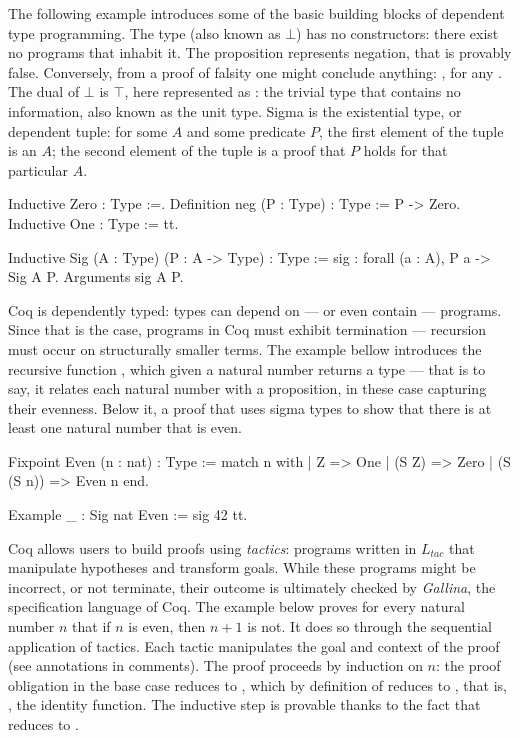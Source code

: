 \documentclass{mproj}
\begin{document}
The following example introduces some of the basic building blocks of dependent type programming. The type  (also known as $\bot$) has no constructors: there exist no programs that inhabit it. The proposition  represents negation, that  is provably false. Conversely, from a proof of falsity one might conclude anything: , for any . The dual of $\bot$ is $\top$, here represented as : the trivial type that contains no information, also known as the unit type. Sigma is the existential type, or dependent tuple: for some $A$ and some predicate $P$, the first element of the tuple is an $A$; the second element of the tuple is a proof that $P$ holds for that particular $A$.

\begin{coq}
    Inductive Zero : Type :=.
    Definition neg (P : Type) : Type := P -> Zero.
    Inductive One : Type := tt.

    Inductive Sig (A : Type) (P : A -> Type) : Type :=
      sig : forall (a : A), P a -> Sig A P.
    Arguments sig {A P}.
\end{coq}

Coq is dependently typed: types can depend on --- or even contain --- programs. Since that is the case, programs in Coq must exhibit termination --- recursion must occur on structurally smaller terms. The example bellow introduces the recursive function , which given a natural number returns a type --- that is to say, it relates each natural number with a proposition, in these case capturing their evenness. Below it, a proof that uses sigma types to show that there is at least one natural number that is even.

\begin{coq}
    Fixpoint Even (n : nat) : Type :=
      match n with
      | Z         => One
      | (S Z)     => Zero
      | (S (S n)) => Even n
      end.

    Example _ : Sig nat Even := sig 42 tt.
\end{coq}

Coq allows users to build proofs using \emph{tactics}: programs written in $L_{tac}$ that manipulate hypotheses and transform goals. While these programs might be incorrect, or not terminate, their outcome is ultimately checked by \emph{Gallina}, the specification language of Coq. The example below proves for every natural number $n$ that if $n$ is even, then $n+1$ is not. It does so through the sequential application of tactics. Each tactic manipulates the goal and context of the proof (see annotations in comments). The proof proceeds by induction on $n$: the proof obligation in the base case reduces to , which by definition of  reduces to , that is, , the identity function. The inductive step is provable thanks to the fact that  reduces to .
\end{document}
